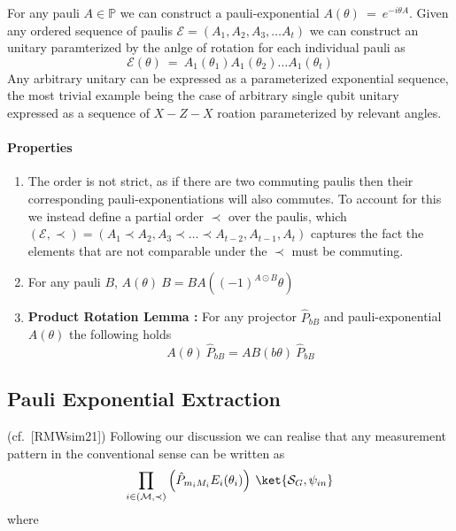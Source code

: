 \documentclass[
]{article}
\providecommand{\tightlist}{%
  \setlength{\itemsep}{0pt}\setlength{\parskip}{0pt}}
\begin{document}
For any pauli \(A \in \mathbb{P}\) we can construct a pauli-exponential
\(A(\theta) \: = \: e^{-i \theta A}\). Given any ordered sequence of
paulis \(\mathcal{E}= (A_{1}, A_{2}, A_{3}, \dots A_{t})\) we can
construct an unitary paramterized by the anlge of rotation for each
individual pauli as
\[\mathcal{E}(\theta)  \: = \: A_{1}(\theta_1) A_{1}(\theta_2) \dots A_{1}(\theta_t) \]
Any arbitrary unitary can be expressed as a parameterized exponential
sequence, the most trivial example being the case of arbitrary single
qubit unitary expressed as a sequence of \(X-Z-X\) roation parameterized
by relevant angles.

\hypertarget{properties-1}{%
\paragraph{Properties}\label{properties-1}}

\begin{enumerate}
\def\labelenumi{\arabic{enumi}.}
\tightlist
\item
  The order is not strict, as if there are two commuting paulis then
  their corresponding pauli-exponentiations will also commutes. To
  account for this we instead define a partial order \(\prec\) over the
  paulis, which
  \((\mathcal{E},\prec) = (A_1 \prec A_2, A_{3}\prec \dots \prec A_{t-2}, A_{t-1}, A_t)\)
  captures the fact the elements that are not comparable under the
  \(\prec\) must be commuting.
\item
  For any pauli \(B\), \(A(\theta) \:B = B A( (-1)^{A \odot B}\theta)\)
\item
  \textbf{Product Rotation Lemma :} For any projector \(\hat{P}_{bB}\)
  and pauli-exponential \(A(\theta)\) the following holds
  \[A(\theta) \: \hat{P}_{bB} = AB(b \theta) \:\hat{P}_{bB}\]
\end{enumerate}

\hypertarget{pauli-exponential-extraction}{%
\subsection{Pauli Exponential
Extraction}\label{pauli-exponential-extraction}}

(cf.~{[}RMWsim21{]}) Following our discussion we can realise that any
measurement pattern in the conventional sense can be written as
\[ \prod_{i \in (\mathcal{M}, \prec)} \left(\hat{P}_{m_iM_{i}}E_i(\theta_{i})\right) \: \ket{\mathcal{S}_{G},\psi_{in}}\]
where
\end{document}

